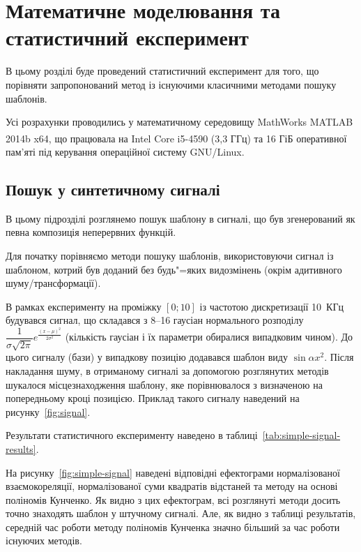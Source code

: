\chapter{Математичне моделювання та статистичний експеримент}
\label{chap:testing}

В цьому розділі буде проведений статистичний експеримент для того, що порівняти запропонований метод із існуючими
класичними методами пошуку шаблонів.

Усі розрахунки проводились у математичному середовищу MathWorks MATLAB 2014b x64, що працювала на
Intel\textsuperscript{\texttrademark} Core i5-4590 (3,3 ГГц) та 16 ГіБ оперативної пам’яті під керування операційної
систему GNU/Linux.

\section{Пошук у синтетичному сигналі}
    В цьому підрозділі розглянемо пошук шаблону в сигналі, що був згенерований як певна композиція неперервних
    функцій.

    Для початку порівняємо методи пошуку шаблонів, використовуючи сигнал із шаблоном, котрий був доданий без
    будь"=яких видозмінень (окрім адитивного шуму/трансформації).

    В рамках експерименту на проміжку ${[0; 10]}$ із частотою дискретизації 10~КГц будувався сигнал, що складався
    з 8--16 гаусіан нормального розподілу $\dfrac{1}{\sigma\sqrt{2\pi}}
    e^{\frac{{\left(x-\mu\right)}^2}{2\sigma^2}}$
    (кількість гаусіан і їх параметри обиралися випадковим чином).
    До цього сигналу (бази) у випадкову позицію додавався шаблон виду $\sin{\alpha x^2}$.
    Після накладання шуму, в отриманому сигналі за допомогою розглянутих методів шукалося місцезнаходження шаблону,
    яке порівнювалося з визначеною на попередньому кроці позицією.
    Приклад такого сигналу наведений на рисунку~\ref{fig:signal}.

    Результати статистичного експерименту наведено в таблиці~\ref{tab:simple-signal-results}.

    На рисунку~\ref{fig:simple-signal} наведені відповідні ефектограми нормалізованої взаємокореляції, нормалізованої
    суми квадратів відстаней та методу на основі поліномів Кунченко.
    Як видно з цих ефектограм, всі розглянуті методи досить точно знаходять шаблон у штучному сигналі.
    Але, як видно з таблиці результатів, середній час роботи методу поліномів Кунченка значно більший за час роботи
    існуючих методів.

